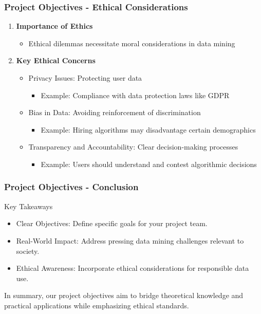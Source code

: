 \documentclass[aspectratio=169]{beamer}
\begin{document}
\begin{frame}[fragile]
    \frametitle{Project Objectives - Ethical Considerations}
    \begin{enumerate}
        \item \textbf{Importance of Ethics}
            \begin{itemize}
                \item Ethical dilemmas necessitate moral considerations in data mining
            \end{itemize}
            
        \item \textbf{Key Ethical Concerns}
            \begin{itemize}
                \item Privacy Issues: Protecting user data
                    \begin{itemize}
                        \item Example: Compliance with data protection laws like GDPR
                    \end{itemize}
                
                \item Bias in Data: Avoiding reinforcement of discrimination
                    \begin{itemize}
                        \item Example: Hiring algorithms may disadvantage certain demographics
                    \end{itemize}
                
                \item Transparency and Accountability: Clear decision-making processes
                    \begin{itemize}
                        \item Example: Users should understand and contest algorithmic decisions
                    \end{itemize}
            \end{itemize}
    \end{enumerate}
\end{frame}

\begin{frame}[fragile]
    \frametitle{Project Objectives - Conclusion}
    \begin{block}{Key Takeaways}
        \begin{itemize}
            \item Clear Objectives: Define specific goals for your project team.
            \item Real-World Impact: Address pressing data mining challenges relevant to society.
            \item Ethical Awareness: Incorporate ethical considerations for responsible data use.
        \end{itemize}
    \end{block}

    In summary, our project objectives aim to bridge theoretical knowledge and practical applications while emphasizing ethical standards.
\end{frame}
\end{document}
